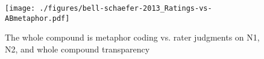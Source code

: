 \begin{figure}[!htb]
  \centering
\texttt{[image: ./figures/bell-schaefer-2013\_Ratings-vs-ABmetaphor.pdf]}  
  \caption{The whole compound is metaphor coding vs. rater judgments on N1, N2, and whole compound transparency}
  \label{fig:bell&schaefer2013_abmetaphor-ratings}
\end{figure}




% 





